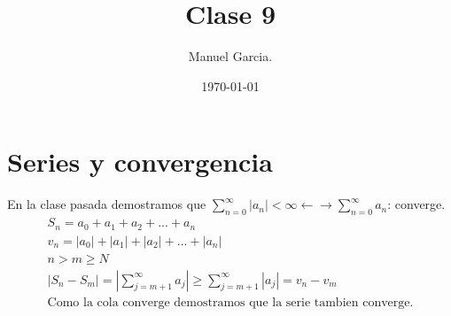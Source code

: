 \documentclass{article}
\title{Clase 9 }
\author{Manuel Garcia.}
\date{\today}
\begin{document}
\maketitle

\section{Series y convergencia}
En la clase pasada demostramos que $ \sum_{n = 0 }^{\infty}|a_n|<\infty \leftarrow  \rightarrow \sum_{n=0 }^{\infty}a_n  $: converge. 
\begin{gather*}
  S_n = a_0+a_1+a_2+...+a_n \\
  v_n = \left|a_0 \right|+\left|a_1 \right| + \left|a_2 \right|+...+\left|a_n \right|\\
  n>m\geq N \\
  \left|S_n - S_m \right| = \left|\displaystyle\sum_{j = m+1 }^{\infty}a_j \right| \geq \displaystyle\sum_{j = m+1 }^{\infty}\left|a_j \right| = v_n - v_m \\
  \text{Como la cola converge demostramos que la serie tambien converge.}
\end{gather*}
\end{document}
